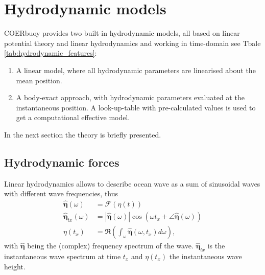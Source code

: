 \documentclass[oneside,10pt,a4paper]{book}
\begin{document}
\chapter{Hydrodynamic models}
COERbuoy provides two built-in hydrodynamic models, all based on linear potential theory and linear hydrodynamics and working in time-domain see Tbale \ref{tab:hydrodynamic_features}:
\begin{enumerate}
	\item A linear model, where all hydrodynamic parameters are linearised about the mean position.
	\item A body-exact approach, with hydrodynamic parameters evaluated at the instantaneous position. A look-up-table with pre-calculated values is used to get a computational effective model.
\end{enumerate} 
In the next section the theory is briefly presented.
\section{Hydrodynamic forces}\label{ssec:hydrodynamicForces}
Linear hydrodynamics allows to describe ocean wave as a sum of sinusoidal waves with different wave frequencies, thus 
\begin{equation}
	\begin{split}\label{eq:FrequencyTime}
		\pmb{\hat{\eta}}(\omega)&=\mathcal{F}(\eta(t))\\
		\pmb{\hat{\eta}}_{tx}(\omega)&=|\pmb{\hat{\eta}}(\omega)| \cos(\omega t_x + \angle\pmb{\hat{\eta}}(\omega))\\
		\eta(t_x) &=\Re\left(\int_{\omega}\pmb{\hat{\eta}}(\omega,t_x)d\omega\right)\text{,}
	\end{split}
\end{equation}
with $\hat{\pmb{\eta}}$ being the (complex) frequency spectrum of the wave. $\hat{\pmb{\eta}}_{tx}$ is the instantaneous wave spectrum at time $t_x$ and $\eta(t_x)$ the instantaneous wave height.
\end{document}

